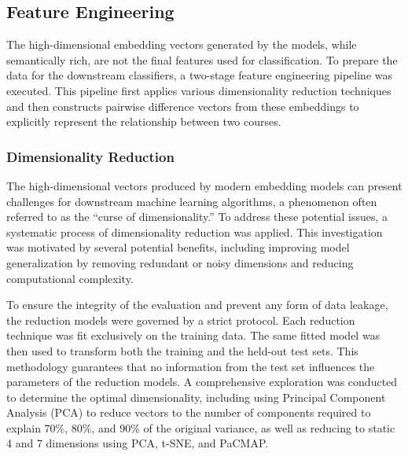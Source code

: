 \subsection{Feature Engineering}\label{ch:3.2.3}
The high-dimensional embedding vectors generated by the models, while semantically rich, are not the final features used for classification. To prepare the data for the downstream classifiers, a two-stage feature engineering pipeline was executed. This pipeline first applies various dimensionality reduction techniques and then constructs pairwise difference vectors from these embeddings to explicitly represent the relationship between two courses.

\subsubsection{Dimensionality Reduction}\label{ch:3.2.3.1}
The high-dimensional vectors produced by modern embedding models can present challenges for downstream machine learning algorithms, a phenomenon often referred to as the ``curse of dimensionality.'' To address these potential issues, a systematic process of dimensionality reduction was applied. This investigation was motivated by several potential benefits, including improving model generalization by removing redundant or noisy dimensions and reducing computational complexity.

To ensure the integrity of the evaluation and prevent any form of data leakage, the reduction models were governed by a strict protocol. Each reduction technique was fit exclusively on the training data. The same fitted model was then used to transform both the training and the held-out test sets. This methodology guarantees that no information from the test set influences the parameters of the reduction models. A comprehensive exploration was conducted to determine the optimal dimensionality, including using Principal Component Analysis (PCA) to reduce vectors to the number of components required to explain 70\%, 80\%, and 90\% of the original variance, as well as reducing to static 4 and 7 dimensions using PCA, t-SNE, and PaCMAP.

